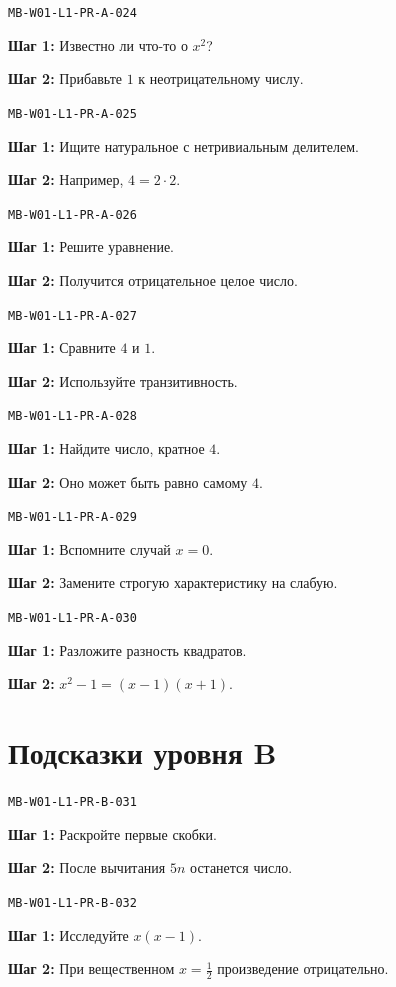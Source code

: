 \documentclass[11pt,a4paper,openany]{book}
\newcommand{\muid}[1]{\texttt{\footnotesize #1}}
\begin{document}
\noindent\muid{MB-W01-L1-PR-A-024}\par 
\textbf{Шаг 1:} Известно ли что-то о $x^2$?\par \textbf{Шаг 2:} Прибавьте $1$ к неотрицательному числу.\smallskip

\noindent\muid{MB-W01-L1-PR-A-025}\par 
\textbf{Шаг 1:} Ищите натуральное с нетривиальным делителем.\par \textbf{Шаг 2:} Например, $4=2\cdot2$.\smallskip

\noindent\muid{MB-W01-L1-PR-A-026}\par 
\textbf{Шаг 1:} Решите уравнение.\par \textbf{Шаг 2:} Получится отрицательное целое число.\smallskip

\noindent\muid{MB-W01-L1-PR-A-027}\par 
\textbf{Шаг 1:} Сравните $4$ и $1$.\par \textbf{Шаг 2:} Используйте транзитивность.\smallskip

\noindent\muid{MB-W01-L1-PR-A-028}\par 
\textbf{Шаг 1:} Найдите число, кратное $4$.\par \textbf{Шаг 2:} Оно может быть равно самому $4$.\smallskip

\noindent\muid{MB-W01-L1-PR-A-029}\par 
\textbf{Шаг 1:} Вспомните случай $x=0$.\par \textbf{Шаг 2:} Замените строгую характеристику на слабую.\smallskip

\noindent\muid{MB-W01-L1-PR-A-030}\par 
\textbf{Шаг 1:} Разложите разность квадратов.\par \textbf{Шаг 2:} $x^2-1=(x-1)(x+1)$.\smallskip

\section{Подсказки уровня B}

\noindent\muid{MB-W01-L1-PR-B-031}\par 
\textbf{Шаг 1:} Раскройте первые скобки.\par \textbf{Шаг 2:} После вычитания $5n$ останется число.\smallskip

\noindent\muid{MB-W01-L1-PR-B-032}\par 
\textbf{Шаг 1:} Исследуйте $x(x-1)$.\par \textbf{Шаг 2:} При вещественном $x=\tfrac12$ произведение отрицательно.\smallskip
\end{document}
